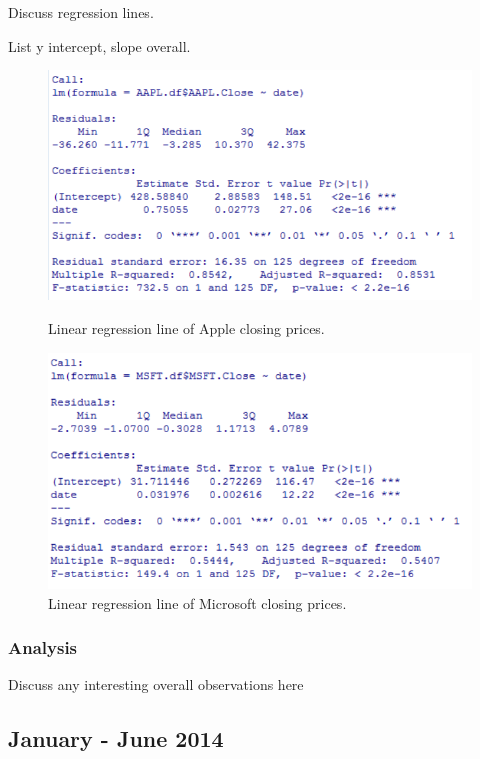 \documentclass[paper=a4, fontsize=11pt]{scrartcl} %
\numberwithin{equation}{section} %
\numberwithin{figure}{section} %
\numberwithin{table}{section} %
\begin{document}
Discuss regression lines. 

List y intercept, slope overall. 

\begin{figure}[!htb]
  \includegraphics[width=\linewidth]{graph/aapl_reg_6.png}
  \caption{Linear regression line of Apple closing prices.}
\endminipage\hfill
{}
  \includegraphics[width=\linewidth]{graph/msft_reg_6.png}
  \caption{Linear regression line of Microsoft closing prices.}
\endminipage\hfill
\end{figure}



\subsubsection{Analysis}
Discuss any interesting overall observations here

\subsection{January - June  2014 }
\end{document}
